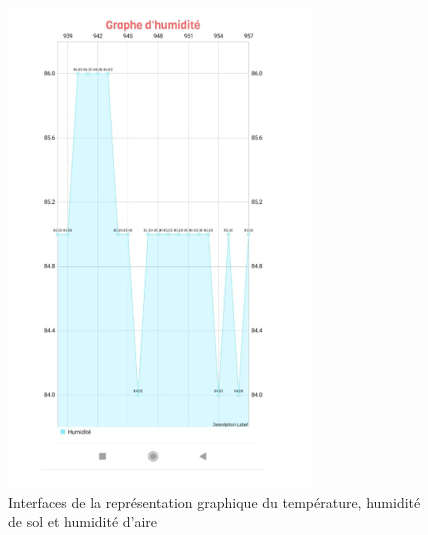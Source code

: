 \begin{flushleft}
\begin{figure}[h]
		\includegraphics{chapitres/images/fenetre5.PNG}
		\caption{Interfaces de la représentation graphique du température, humidité de sol et humidité d'aire}
		\label{fig:labelname}
	\end{figure}
	
	\newpage
\end{flushleft}